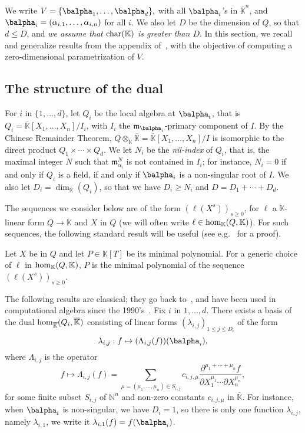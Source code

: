 \documentclass[12pt]{article}
\newcommand{\lf}{X}
\def\N {\ensuremath{\mathbb{N}}}
\def\K{\mathbb{K}}
\def\K {\ensuremath{\mathbb{K}}}
\def\Kbar {{\ensuremath{\overline{\mathbb{K}}}}}
\def\D {\ensuremath{D}}
\def\m {\ensuremath{\mathfrak{m}}}
\begin{document}
We write $V=\{\balpha_1,\dots,\balpha_d\},$ with all $\balpha_i$'s in
$\Kbar^n$, and $\balpha_i=(\alpha_{i,1},\dots,\alpha_{i,n})$ for all
$i$.  We also let $\D$ be the dimension of $Q$, so that $d \le \D$,
and {\em we assume that ${\rm char}(\K)$ is greater than $D$}. In this
section, we recall and generalize results from the appendix
of~\cite{BoSaSc03}, with the objective of computing a zero-dimensional
parametrization of $V$.


\subsection{The structure of the dual}  

For $i$ in $\{1,\dots,d\}$, let $Q_i$ be the local algebra at
$\balpha_i$, that is $Q_i=\Kbar[X_1,\dots,X_n]/I_i$, with $I_i$ the
$\m_{\balpha_i}$-primary component of $I$. By the Chinese Remainder
Theorem, $Q\otimes_\K \Kbar=\Kbar[X_1,\dots,X_n]/I$ is isomorphic to
the direct product $Q_1\times \cdots \times Q_d$.  We let $N_i$ be the
{\em nil-index} of $Q_i$, that is, the maximal integer $N$ such that
$\m_{\alpha_i}^N$ is not contained in $I_i$; for instance, $N_i=0$ if
and only if $Q_i$ is a field, if and only if $\balpha_i$ is a
non-singular root of $I$. We also let
$\D_i=\dim_\Kbar(Q_i)$, so that we have $D_i \ge N_i$ and $\D=\D_1 + \cdots + \D_d$.

The sequences we consider below are of the form $(\ell(\lf^s))_{s \ge
  0}$, for $\ell$ a $\K$-linear form $Q \to \K$ and $\lf$ in $Q$
(we will often write $\ell \in {\rm hom}_\K(Q,\K)$). For
such sequences, the following standard result will be useful
(see e.g.~\cite[Proposition~1 \& 2]{BoSaSc03} for a proof).
\begin{lemma}\label{lemma:minpoly}
  Let $\lf$ be in $Q$ and let $P \in \K[T]$ be its minimal
  polynomial. For a generic choice of $\ell$ in ${\rm hom}_\K(Q,\K)$,
  $P$ is the minimal polynomial of the sequence $(\ell(\lf^s))_{s \ge
    0}$.
\end{lemma}

The following results are classical; they go back
to~\cite{Macaulay16}, and have been used in computational algebra
since the 1990's~\cite{MaMoMo96,Mourrain97}. Fix $i$ in $1,\dots,d$.
There exists a basis of the dual ${\rm hom}_\Kbar(Q_i,\Kbar)$
consisting of linear forms $(\lambda_{i,j})_{1\le j \le \D_i}$ of the
form
$$\lambda_{i,j}: f \mapsto (\Lambda_{i,j}(f))(\balpha_i),$$
where $\Lambda_{i,j}$ is the operator
$$f \mapsto \Lambda_{i,j}(f) = \sum_{\mu=(\mu_1,\dots,\mu_n) \in
	S_{i,j}} c_{i,j,\mu} \frac{ \partial^{\mu_1 + \cdots + \mu_n} f}
{\partial X_1^{\mu_1} \cdots \partial X_n^{\mu_n}},$$ for some finite
subset $S_{i,j}$ of $\N^n$ and non-zero constants $c_{i,j,\mu}$ in
$\Kbar$. 
For instance, when $\balpha_i$ is non-singular, we have $D_i=1$, so
there is only one function $\lambda_{i,j}$, namely $\lambda_{i,1}$, we
write it $\lambda_{i,1}(f) = f(\balpha_i)$.
\end{document}
